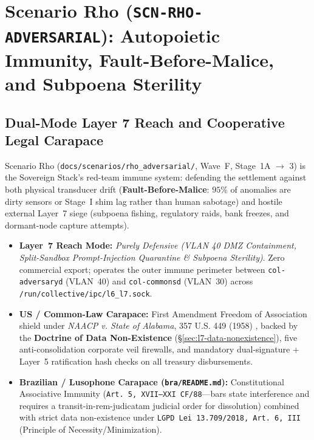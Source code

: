 \chapter{Scenario Rho (\texttt{SCN-RHO-ADVERSARIAL}): Autopoietic Immunity, Fault-Before-Malice, and Subpoena Sterility}
\label{app:scenario-rho}

\section{Dual-Mode Layer 7 Reach and Cooperative Legal Carapace}
Scenario Rho (\texttt{docs/scenarios/rho\_adversarial/}, Wave~F, Stage~1A $\to$ 3) is the Sovereign Stack's red-team immune system: defending the settlement against both physical transducer drift (\textbf{Fault-Before-Malice}: $95\%$ of anomalies are dirty sensors or Stage~I shim lag rather than human sabotage) and hostile external Layer~7 siege (subpoena fishing, regulatory raids, bank freezes, and dormant-node capture attempts).
\begin{itemize}
    \item \textbf{Layer~7 Reach Mode:} \textit{Purely Defensive (VLAN 40 DMZ Containment, Split-Sandbox Prompt-Injection Quarantine \& Subpoena Sterility)}. Zero commercial export; operates the outer immune perimeter between \texttt{col-adversaryd} (VLAN~40) and \texttt{col-commonsd} (VLAN~30) across \texttt{/run/collective/ipc/l6\_l7.sock}.
    \item \textbf{US / Common-Law Carapace:} First Amendment Freedom of Association shield under \textit{NAACP v. State of Alabama}, 357 U.S. 449 (1958) \parencite{naacp1958}, backed by the \textbf{Doctrine of Data Non-Existence} (\S\ref{sec:l7-data-nonexistence}), five anti-consolidation corporate veil firewalls, and mandatory dual-signature + Layer~5 ratification hash checks on all treasury disbursements.
    \item \textbf{Brazilian / Lusophone Carapace (\texttt{bra/README.md}):} Constitutional Associative Immunity (\texttt{Art.~5{\textordmasculine}, XVII--XXI CF/88}---bars state interference and requires a transit-in-rem-judicatam judicial order for dissolution) combined with strict data non-existence under \texttt{LGPD Lei 13.709/2018, Art.~6{\textordmasculine}, III} (Principle of Necessity/Minimization).
\end{itemize}

